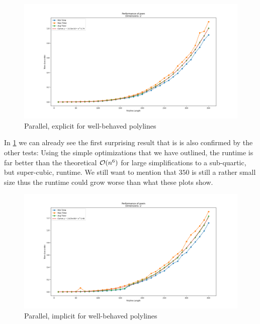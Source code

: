 \begin{figure}[ht]
  \centering
  \includegraphics[scale=0.5, width=\linewidth]{figures/psen.png}
  \caption{Parallel, explicit for well-behaved polylines}
  \label{fig:psen}
\end{figure}

In \cref{fig:psen} we can already see the first surprising result that is is also confirmed by the other tests: Using the simple optimizations that we have outlined, the runtime is far better than the theoretical \(\mathcal{O}(n^6)\) for large simplifications to a sub-quartic, but super-cubic, runtime. We still want to mention that \(350\) is still a rather small size thus the runtime could grow worse than what these plots show. 

\begin{figure}[ht]
  \centering
  \includegraphics[scale=0.5, width=\linewidth]{figures/psein.png}
  \caption{Parallel, implicit for well-behaved polylines}
  \label{fig:psein}
\end{figure}

